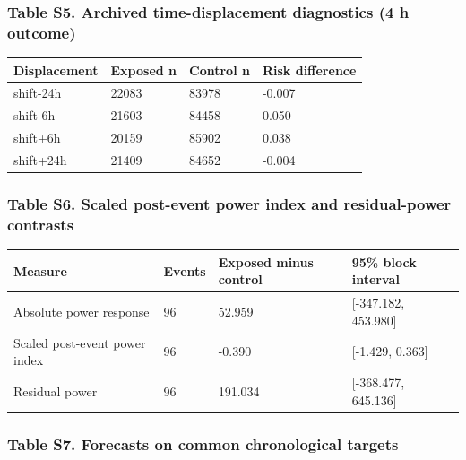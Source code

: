 \documentclass[a4paper,11pt]{article}
\newcounter{none}
\begin{document}
\subsubsection{Table S5. Archived time-displacement diagnostics (4 h outcome)}\label{table-s5.-archived-time-displacement-diagnostics-4-h-outcome}

{\def\LTcaptype{none} %
\begin{longtable}[]{@{}llll@{}}
\toprule\noalign{}
Displacement & Exposed n & Control n & Risk difference \\
\midrule\noalign{}
\endhead
\bottomrule\noalign{}
\endlastfoot
shift-24h & 22083 & 83978 & -0.007 \\
shift-6h & 21603 & 84458 & 0.050 \\
shift+6h & 20159 & 85902 & 0.038 \\
shift+24h & 21409 & 84652 & -0.004 \\
\end{longtable}
}

\subsubsection{Table S6. Scaled post-event power index and residual-power contrasts}\label{table-s6.-scaled-post-event-power-index-and-residual-power-contrasts}

{\def\LTcaptype{none} %
\begin{longtable}[]{@{}llll@{}}
\toprule\noalign{}
Measure & Events & Exposed minus control & 95\% block interval \\
\midrule\noalign{}
\endhead
\bottomrule\noalign{}
\endlastfoot
Absolute power response & 96 & 52.959 & {[}-347.182, 453.980{]} \\
Scaled post-event power index & 96 & -0.390 & {[}-1.429, 0.363{]} \\
Residual power & 96 & 191.034 & {[}-368.477, 645.136{]} \\
\end{longtable}
}

\subsubsection{Table S7. Forecasts on common chronological targets}\label{table-s7.-forecasts-on-common-chronological-targets}
\end{document}
